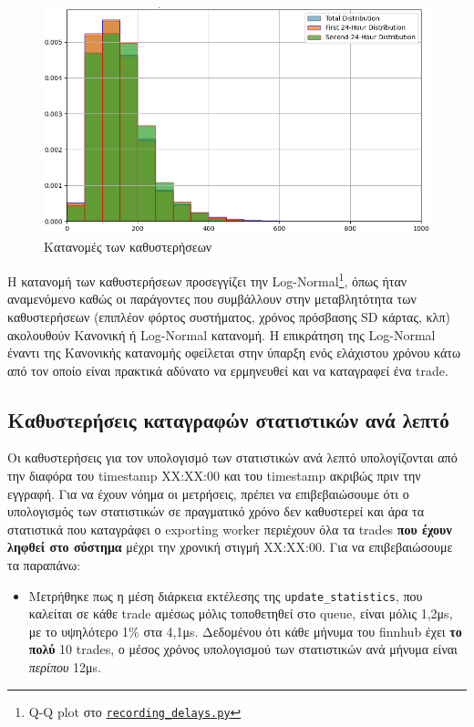 \documentclass[12pt]{article}
\newcommand{\scripts}[1]{\href{https://github.com/Selivanof/university-collection/tree/main/RealTime_Embedded_Systems/scripts}{\texttt{#1}}}
\begin{document}
\begin{figure}[H]
    \centering
    \begin{minipage}{0.8\textwidth}
        \centering
        \includegraphics[width=\linewidth]{records.png} %
        \caption{Κατανομές των καθυστερήσεων}
        \label{fig:recs}
    \end{minipage}
\end{figure}


Η κατανομή των καθυστερήσεων προσεγγίζει την Log-Normal\footnote{Q-Q plot στο \scripts{recording\_delays.py}}, όπως ήταν αναμενόμενο καθώς οι παράγοντες που συμβάλλουν στην μεταβλητότητα των καθυστερήσεων (επιπλέον φόρτος συστήματος, χρόνος πρόσβασης SD κάρτας, κλπ) ακολουθούν Κανονική ή Log-Normal κατανομή. Η επικράτηση της Log-Normal έναντι της Κανονικής κατανομής οφείλεται στην ύπαρξη ενός ελάχιστου χρόνου κάτω από τον οποίο είναι πρακτικά αδύνατο να ερμηνευθεί και να καταγραφεί ένα trade.


\subsection{Καθυστερήσεις καταγραφών στατιστικών ανά λεπτό}
Οι καθυστερήσεις για τον υπολογισμό των στατιστικών ανά λεπτό υπολογίζονται από την διαφόρα του timestamp ΧΧ:ΧΧ:00 και του timestamp ακριβώς πριν την εγγραφή. Για να έχουν νόημα οι μετρήσεις, πρέπει να επιβεβαιώσουμε ότι ο υπολογισμός των στατιστικών σε πραγματικό χρόνο δεν καθυστερεί και άρα τα στατιστικά που καταγράφει ο exporting worker περιέχουν όλα τα trades \textbf{που έχουν ληφθεί στο σύστημα} μέχρι την χρονική στιγμή XX:XX:00. Για να επιβεβαιώσουμε τα παραπάνω:
\begin{itemize}
    \item Μετρήθηκε πως η μέση διάρκεια εκτέλεσης της \texttt{update\_statistics}, που καλείται σε κάθε trade αμέσως μόλις τοποθετηθεί στο queue, είναι μόλις 1,2μs, με το υψηλότερο 1\% στα 4,1μs. Δεδομένου ότι κάθε μήνυμα του finnhub έχει \textbf{το πολύ} 10 trades, ο μέσος χρόνος υπολογισμού των στατιστικών ανά μήνυμα είναι \textit{περίπου} 12μs.
\end{itemize}
\end{document}
